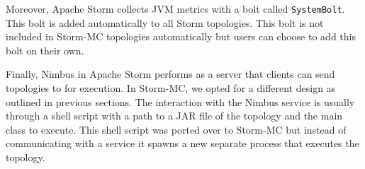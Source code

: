 Moreover, Apache Storm collects JVM metrics with a bolt called \texttt{SystemBolt}. This bolt is added automatically to all Storm topologies. This bolt is not included in Storm-MC topologies automatically but users can choose to add this bolt on their own.

Finally, Nimbus in Apache Storm performs as a server that clients can send topologies to for execution. In Storm-MC, we opted for a different design as outlined in previous sections. The interaction with the Nimbus service is usually through a shell script with a path to a JAR file of the topology and the main class to execute. This shell script was ported over to Storm-MC but instead of communicating with a service it spawns a new separate process that executes the topology.


